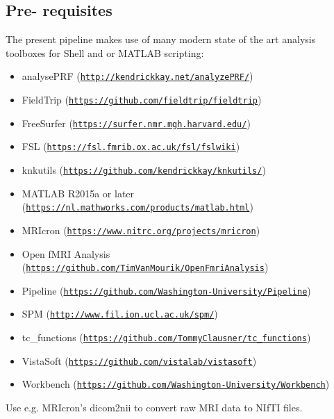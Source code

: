 \documentclass[12pt,a4paper]{scrartcl}
\begin{document}
\subsection{Pre- requisites}
\label{sec:prereq}
The present pipeline makes use of many modern state of the art analysis toolboxes for Shell and or MATLAB scripting:
\begin{itemize}
\item analysePRF (\href{http://kendrickkay.net/analyzePRF/}{\nolinkurl{http://kendrickkay.net/analyzePRF/}})
\item FieldTrip (\href{https://github.com/fieldtrip/fieldtrip}{\nolinkurl{https://github.com/fieldtrip/fieldtrip}})
\item FreeSurfer (\href{https://surfer.nmr.mgh.harvard.edu/}{\nolinkurl{https://surfer.nmr.mgh.harvard.edu/}})
\item FSL (\href{https://fsl.fmrib.ox.ac.uk/fsl/fslwiki}{\nolinkurl{https://fsl.fmrib.ox.ac.uk/fsl/fslwiki}})
\item knkutils (\href {https://github.com/kendrickkay/knkutils/}{\nolinkurl{https://github.com/kendrickkay/knkutils/}})
\item MATLAB R2015a or later (\href{https://nl.mathworks.com/products/matlab.html}{\nolinkurl{https://nl.mathworks.com/products/matlab.html}})
\item MRIcron (\href{https://www.nitrc.org/projects/mricron}{\nolinkurl{https://www.nitrc.org/projects/mricron}})
\item Open fMRI Analysis (\href{https://github.com/TimVanMourik/OpenFmriAnalysis}{\nolinkurl{https://github.com/TimVanMourik/OpenFmriAnalysis}})
\item Pipeline (\href{https://github.com/Washington-University/Pipeline}{\nolinkurl{https://github.com/Washington-University/Pipeline}})
\item SPM (\href{http://www.fil.ion.ucl.ac.uk/spm/}{\nolinkurl{http://www.fil.ion.ucl.ac.uk/spm/}})
\item tc\_functions  (\href{https://github.com/TommyClausner/tc\_functions}{\nolinkurl{https://github.com/TommyClausner/tc\_functions}})
\item VistaSoft (\href{https://github.com/vistalab/vistasoft}{\nolinkurl{https://github.com/vistalab/vistasoft}})
\item Workbench (\href{https://github.com/Washington-University/Workbench}{\nolinkurl{https://github.com/Washington-University/Workbench}})
\end{itemize}

\noindent Use e.g. MRIcron's dicom2nii to convert raw MRI data to NIfTI files.\\
\end{document}
